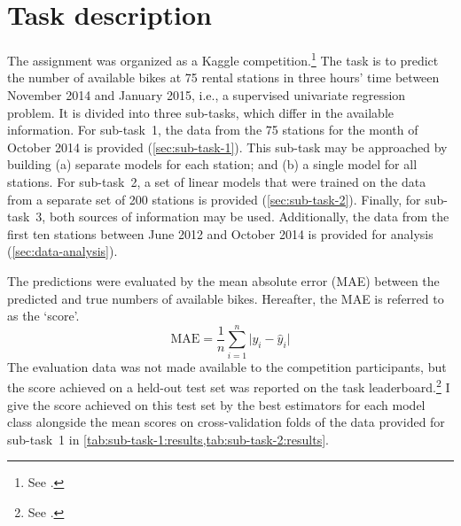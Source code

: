 \section{Task description}
\label{sec:task-description}

The assignment was organized as a Kaggle competition.\footnote{See .
}
The task is to predict the number of available bikes at 75 rental stations in three
hours' time between November 2014 and January 2015, i.e., a supervised univariate
regression problem.
It is divided into three sub-tasks, which differ in the available information.
For sub-task~1, the data from the 75 stations for the month of October 2014 is provided
(\cref{sec:sub-task-1}).
This sub-task may be approached by building (a) separate models for each station; and
(b) a single model for all stations.
For sub-task~2, a set of linear models that were trained on the data from a separate
set of 200 stations is provided (\cref{sec:sub-task-2}).
Finally, for sub-task~3, both sources of information may be used.
Additionally, the data from the first ten stations between June 2012 and October 2014
is provided for analysis (\cref{sec:data-analysis}).

The predictions were evaluated by the mean absolute error (MAE) between the predicted
and true numbers of available bikes.
Hereafter, the MAE is referred to as the `score'.
\begin{equation}
  \label{eq:mae}
  \text{MAE} = \frac{1}{n} \sum_{i = 1}^n \lvert y_i - \hat{y}_i \rvert
\end{equation}
The evaluation data was not made available to the competition participants, but the
score achieved on a held-out test set was reported on the task
leaderboard.\footnote{See .
}
I give the score achieved on this test set by the best estimators for each model class
alongside the mean scores on cross-validation folds of the data provided for sub-task~1
in \cref{tab:sub-task-1:results,tab:sub-task-2:results}.
